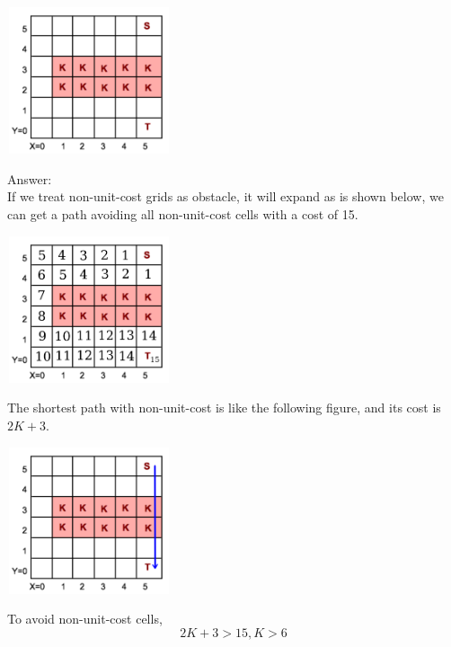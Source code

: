 \documentclass[12pt]{article}
\begin{document}
        \begin{center}
            \includegraphics[width = 1.90in, height = 1.70in]{figure11.png}
        \end{center}

        \noindent
        Answer:\\

        \noindent
        If we treat non-unit-cost grids as obstacle, it will expand as is shown below, we can
        get a path avoiding all non-unit-cost cells with a cost of 15.

        \begin{center}
            \includegraphics[width = 1.90in, height = 1.70in]{figure12.png}
        \end{center}

        \noindent
        The shortest path with non-unit-cost is like the following figure, and its cost is
        $2K+3$.

        \begin{center}
            \includegraphics[width = 1.90in, height = 1.70in]{figure13.png}
        \end{center}

        To avoid non-unit-cost cells,
        \[2K+3>15, K>6\]
\end{document}
